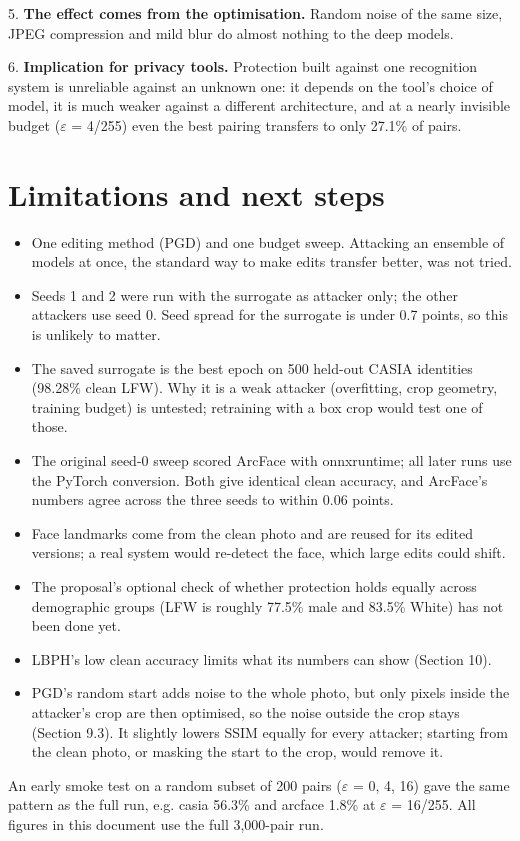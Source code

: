 \documentclass[10pt,a4paper]{article}
\begin{document}
5. \textbf{The effect comes from the optimisation.} Random noise of the same size, JPEG compression and mild blur do almost nothing to the deep models.


6. \textbf{Implication for privacy tools.} Protection built against one recognition system is unreliable against an unknown one: it depends on the tool's choice of model, it is much weaker against a different architecture, and at a nearly invisible budget ($\varepsilon$ = 4/255) even the best pairing transfers to only 27.1\% of pairs.


\section{Limitations and next steps}

\begin{itemize}
  \item  One editing method (PGD) and one budget sweep. Attacking an ensemble of models at once, the standard way to make edits transfer better, was not tried.
  \item  Seeds 1 and 2 were run with the surrogate as attacker only; the other attackers use seed 0. Seed spread for the surrogate is under 0.7 points, so this is unlikely to matter.
  \item  The saved surrogate is the best epoch on 500 held-out CASIA identities (98.28\% clean LFW). Why it is a weak attacker (overfitting, crop geometry, training budget) is untested; retraining with a box crop would test one of those.
  \item  The original seed-0 sweep scored ArcFace with onnxruntime; all later runs use the PyTorch conversion. Both give identical clean accuracy, and ArcFace's numbers agree across the three seeds to within 0.06 points.
  \item  Face landmarks come from the clean photo and are reused for its edited versions; a real system would re-detect the face, which large edits could shift.
  \item  The proposal's optional check of whether protection holds equally across demographic groups (LFW is roughly 77.5\% male and 83.5\% White) has not been done yet.
  \item  LBPH's low clean accuracy limits what its numbers can show (Section 10).
  \item  PGD's random start adds noise to the whole photo, but only pixels inside the attacker's crop are then optimised, so the noise outside the crop stays (Section 9.3). It slightly lowers SSIM equally for every attacker; starting from the clean photo, or masking the start to the crop, would remove it.
\end{itemize}

{\small\color{subtle} An early smoke test on a random subset of 200 pairs ($\varepsilon$ = 0, 4, 16) gave the same pattern as the full run, e.g. casia 56.3\% and arcface 1.8\% at $\varepsilon$ = 16/255. All figures in this document use the full 3,000-pair run.\par}
\end{document}
